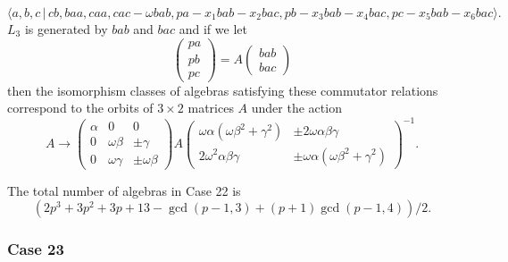 \documentclass[10pt]{article}
\begin{document}
\begin{equation}
\langle a,b,c\,|\,cb,baa,caa,cac-\omega
bab,pa-x_{1}bab-x_{2}bac,pb-x_{3}bab-x_{4}bac,pc-x_{5}bab-x_{6}bac\rangle . 
\tag{7.778}
\end{equation}%
$L_{3}$ is generated by $bab$ and $bac$ and if we let 
\[
\left( 
\begin{array}{l}
pa \\ 
pb \\ 
pc%
\end{array}%
\right) =A\left( 
\begin{array}{l}
bab \\ 
bac%
\end{array}%
\right) 
\]%
then the isomorphism classes of algebras satisfying these commutator
relations correspond to the orbits of $3\times 2$ matrices $A$ under the
action 
\[
A\rightarrow \left( 
\begin{array}{lll}
\alpha & 0 & 0 \\ 
0 & \omega \beta & \pm \gamma \\ 
0 & \omega \gamma & \pm \omega \beta%
\end{array}%
\right) A\left( 
\begin{array}{ll}
\omega \alpha (\omega \beta ^{2}+\gamma ^{2}) & \pm 2\omega \alpha \beta
\gamma \\ 
2\omega ^{2}\alpha \beta \gamma & \pm \omega \alpha (\omega \beta
^{2}+\gamma ^{2})%
\end{array}%
\right) ^{-1}. 
\]

The total number of algebras in Case 22 is 
\[
(2p^{3}+3p^{2}+3p+13-\gcd (p-1,3)+(p+1)\gcd (p-1,4))/2. 
\]

\subsubsection{Case 23}
\end{document}
